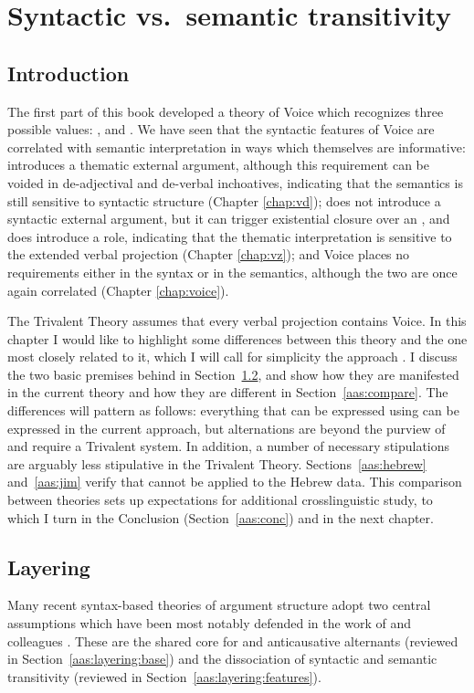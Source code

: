 \chapter{Syntactic vs.~semantic transitivity}
\label{chap:aas}

\section{Introduction} \label{sec:intro}
The first part of this book developed a theory of Voice which recognizes three possible values: {\vd}, {\vz} and . We have seen that the syntactic features of Voice are correlated with semantic interpretation in ways which themselves are informative: {\vd} introduces a thematic external argument, although this requirement can be voided in de-adjectival and de-verbal inchoatives, indicating that the semantics is still sensitive to syntactic structure (Chapter \ref{chap:vd}); {\vz} does not introduce a syntactic external argument, but it can trigger existential closure over an , and {\pz} does introduce a  role, indicating that the thematic interpretation is sensitive to the extended verbal projection (Chapter \ref{chap:vz}); and Voice places no requirements either in the syntax or in the semantics, although the two are once again correlated (Chapter \ref{chap:voice}).

The Trivalent Theory assumes that every verbal projection contains Voice. In this chapter I would like to highlight some differences between this theory and the one most closely related to it, which I will call for simplicity the \textsc{} approach \citep{schaefer08,layering15}. I discuss the two basic premises behind  in Section~\ref{aas:layering}, and show how they are manifested in the current theory and how they are different in Section~\ref{aas:compare}. The differences will pattern as follows: everything that can be expressed using  can be expressed in the current approach, but  alternations are beyond the purview of  and require a Trivalent system. In addition, a number of necessary stipulations are arguably less stipulative in the Trivalent Theory. Sections~\ref{aas:hebrew} and~\ref{aas:jim} verify that  cannot be applied to the Hebrew data. This comparison between theories sets up expectations for additional crosslinguistic study, to which I turn in the Conclusion (Section~\ref{aas:conc}) and in the next chapter.


\section{Layering} \label{aas:layering}
Many recent syntax-based theories of argument structure adopt two central assumptions which have been most notably defended in the work of \cite{schaefer08} and colleagues \citep{alexiadouetal06,layering15}. These are the shared core for  and anticausative alternants (reviewed in Section~\ref{aas:layering:base}) and the dissociation of syntactic and semantic transitivity (reviewed in Section~\ref{aas:layering:features}).

